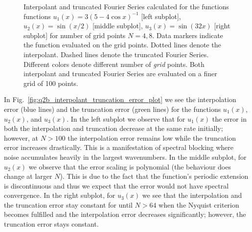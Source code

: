 \documentclass[12pt]{article}
\begin{document}
\begin{figure}[!h]
    \caption{
        Interpolant and truncated Fourier Series calculated for the functions functions $u_{1}(x) = 3\left(5-4\cos x\right)^{-1}$ [left subplot], 
        $u_{2}(x) = \sin(x/2)$ [middle subplot], $u_{3}(x) = \sin(32x)$ [right subplot] for number of grid points $N = 4, 8$. 
        Data markers indicate the function evaluated on the grid points. 
        Dotted lines denote the interpolant. 
        Dashed lines denote the truncated Fourier Series. 
        Different colors denote different number of \emph{grid} points.  
        Both interpolant and truncated Fourier Series are evaluated on a finer grid of 100 points.
    }
    \label{fig:q2b_interpolant_truncation_plot}
\end{figure}

In Fig.~\ref{fig:q2b_interpolant_truncation_error_plot} we see the interpolation error (blue lines) and the truncation error (green lines) for the functions $u_{1}(x)$, $u_{2}(x)$, and $u_{3}(x)$. In the left subplot we observe that for $u_{1}(x)$ the error in both the interpolation and truncation decrease at the same rate initially; however, at $N > 100$ the interpolation error remains low while the truncation error increases drastically. This is a manifestation of spectral blocking where noise accumulates heavily in the largest wavenumbers. In the middle subplot, for $u_{2}(x)$ we observe that the error scaling is polynomial (the behaviour does change at larger $N$). This is due to the fact that the function's periodic extension is discontinuous and thus we expect that the error would not have spectral convergence. In the right subplot, for $u_{3}(x)$ we see that the interpolation and the truncation error stay constant for until $N > 64$ when the Nyquist criterion becomes fulfilled and the interpolation error decreases significantly; however, the truncation error stays constant.
\end{document}
